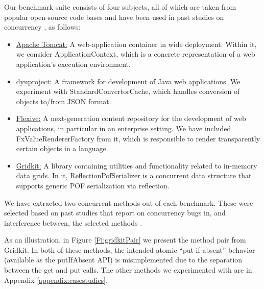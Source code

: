 Our benchmark suite consists of four subjects, all of which are taken from popular open-source code bases and have been used in past studies on concurrency \cite{oopsla/ShachamBASVY11,issta/ShachamYGABSV14}, as follows:
\begin{itemize}
	\item \underline{Apache Tomcat:} A web-application container in wide deployment. Within it, we consider {\sf ApplicationContext}, which is a concrete representation of a web application's execution environment.
	\item \underline{dyuproject:} A framework for development of Java web applications. We experiment with {\sf StandardConvertorCache}, which handles conversion of objects to/from JSON format.
	\item \underline{Flexive:} A next-generation content repository for the development of web applications, in particular in an enterprise setting. We have included {\sf FxValueRendererFactory} from it, which is responsible to render transparently certain objects in a language.
	\item \underline{Gridkit:} A library containing utilities and functionality related to in-memory data grids. In it, {\sf ReflectionPofSerializer} is a concurrent data structure that supports generic POF serialization via reflection.
\end{itemize}

We have extracted two concurrent methods out of each benchmark. These were selected based on past studies that report on concurrency bugs in, and interference between, the selected methods \cite{oopsla/ShachamBASVY11}. 

As an illustration, in Figure \ref{Fi:gridkitPair} we present the method pair from Gridkit. In both of these methods, the intended atomic ``put-if-absent'' behavior (available as the {\sf putIfAbsent} API) is misimplemented due to the separation between the {\sf get} and {\sf put} calls. The other methods we experimented with are in Appendix \ref{appendix:casestudies}.

